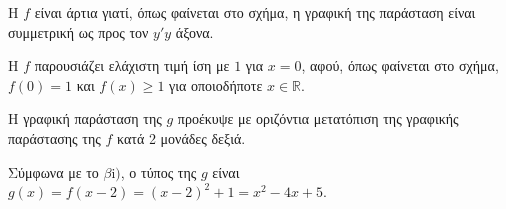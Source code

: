 \begin{alist}
\item 
\begin{rlist}
\item Η $f$ είναι άρτια γιατί, όπως φαίνεται στο σχήμα, η γραφική της παράσταση είναι συμμετρική ως προς τον $y'y$ άξονα.
\item Η $f$ παρουσιάζει ελάχιστη τιμή ίση με $1$ για $x=0$, αφού, όπως φαίνεται στο σχήμα, $f(0) = 1$ και $f(x) \ge 1$ για οποιοδήποτε $x \in \mathbb{R}$.
\end{rlist}
\item 
\begin{rlist}
\item Η γραφική παράσταση της $g$ προέκυψε με οριζόντια μετατόπιση της γραφικής παράστασης της $f$ κατά 2 μονάδες δεξιά.
\item Σύμφωνα με το $\beta\text{i)}$, ο τύπος της $g$ είναι $g(x) = f(x-2) = (x-2)^2 + 1 = x^2 - 4x + 5$.
\end{rlist}
\end{alist}

